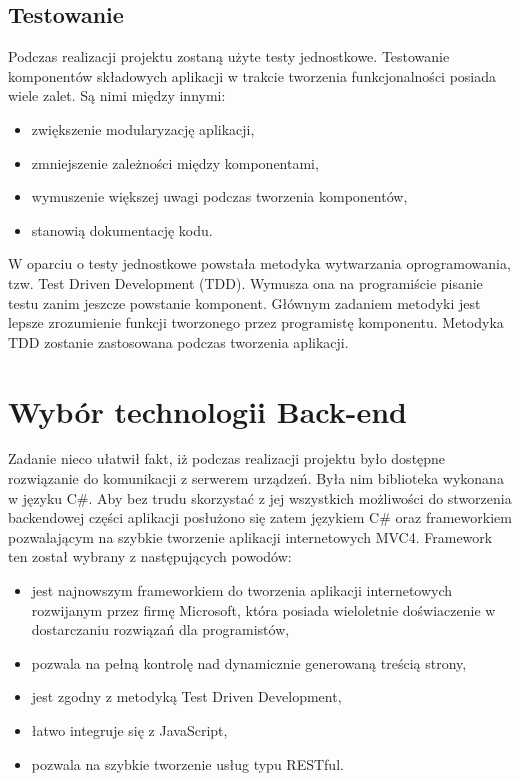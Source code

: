 \subsection{Testowanie}
Podczas realizacji projektu zostaną użyte testy jednostkowe. Testowanie komponentów składowych aplikacji w trakcie tworzenia funkcjonalności posiada wiele zalet. Są nimi między innymi\cite{tests-book}:
\begin{itemize}
\item zwiększenie modularyzację aplikacji,
\item zmniejszenie zależności między komponentami,
\item wymuszenie większej uwagi podczas tworzenia komponentów,
\item stanowią dokumentację kodu.
\end{itemize}

W oparciu o testy jednostkowe powstała metodyka wytwarzania oprogramowania, tzw. Test Driven Development (TDD)\cite{tests-book}. Wymusza ona na programiście pisanie testu zanim jeszcze powstanie komponent. Głównym zadaniem metodyki jest lepsze zrozumienie funkcji tworzonego przez programistę komponentu. 
Metodyka TDD zostanie zastosowana podczas tworzenia aplikacji.

\section{Wybór technologii Back-end}

Zadanie nieco ułatwił fakt, iż podczas realizacji projektu było dostępne rozwiązanie do komunikacji z serwerem urządzeń. Była nim biblioteka wykonana w języku C\#. Aby bez trudu skorzystać z jej wszystkich możliwości do stworzenia backendowej części aplikacji posłużono się zatem językiem C\# oraz frameworkiem pozwalającym na szybkie tworzenie aplikacji internetowych MVC4. Framework ten został wybrany z następujących powodów\cite{mvc-book}:

\begin{itemize}
\item jest najnowszym frameworkiem do tworzenia aplikacji internetowych rozwijanym przez firmę Microsoft, która posiada wieloletnie doświaczenie w dostarczaniu rozwiązań dla programistów,
\item pozwala na pełną kontrolę nad dynamicznie generowaną treścią strony,
\item jest zgodny z metodyką Test Driven Development,
\item łatwo integruje się z JavaScript,
\item pozwala na szybkie tworzenie usług typu RESTful.
\end{itemize}


